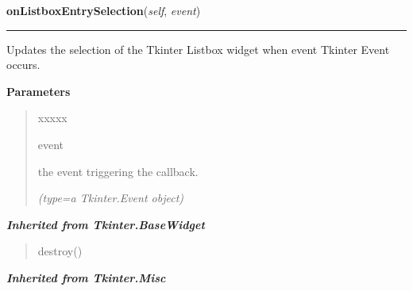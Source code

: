     \vspace{0.5ex}

\hspace{.8\funcindent}\begin{boxedminipage}{\funcwidth}

    \raggedright \textbf{onListboxEntrySelection}(\textit{self}, \textit{event})

    \vspace{-1.5ex}

    \rule{\textwidth}{0.5\fboxrule}
\setlength{\parskip}{2ex}
    Updates the selection of the Tkinter Listbox widget when 
    {\textbar}event{\textbar} Tkinter Event occurs.

\setlength{\parskip}{1ex}
      \textbf{Parameters}
      \vspace{-1ex}

      \begin{quote}
        \begin{Ventry}{xxxxx}

          \item[event]

          the event triggering the callback.

            {\it (type=a Tkinter.Event object)}

        \end{Ventry}

      \end{quote}

    \end{boxedminipage}


\large{\textbf{\textit{Inherited from Tkinter.BaseWidget}}}

\begin{quote}
destroy()
\end{quote}

\large{\textbf{\textit{Inherited from Tkinter.Misc}}}

